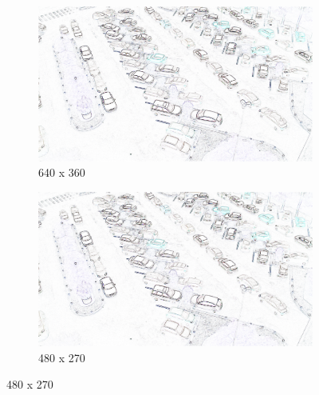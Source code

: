 \begin{appendix}
\begin{figure}[H]
    \bigskip
    \begin{subfigure}{.5\textwidth}
        \centering
        \includegraphics[width=.85\linewidth]{img/conception/image_process/edge-downsample/3.png}
        \caption{640 x 360}
    \end{subfigure}%
    \begin{subfigure}{.5\textwidth}
        \centering
        \includegraphics[width=.85\linewidth]{img/conception/image_process/edge-downsample/2.png}
        \caption{480 x 270}
    \end{subfigure}%
    

\end{figure}
\end{appendix}
